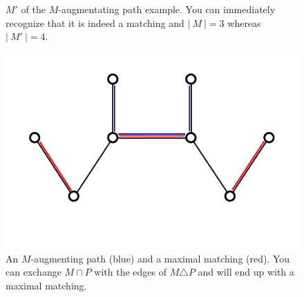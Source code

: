 \documentclass[a4paper]{article}
\theoremstyle{definition}
\newcommand{\card}[1]{\left|\:\!#1\:\!\right|}
\begin{document}
\begin{figure}[p]
\begin{center}
    \caption{
      $M'$ of the $M$-augmentating path example.
      You can immediately recognize that it is indeed a matching
      and $\card{M} = 3$ whereas $\card{M'} = 4$.
    }
    \label{img:mprime}
  \end{center}
  \begin{center}
    \includegraphics{img/M-augmenting_path_and_maximal.pdf}
    \caption{
      An $M$-augmenting path (blue) and a maximal matching (red).
      You can exchange $M \cap P$ with the edges of $M \triangle P$
      and will end up with a maximal matching.
    }
    \label{img:augmenting-and-maximal}
  \end{center}
\end{figure}
%
\end{document}

